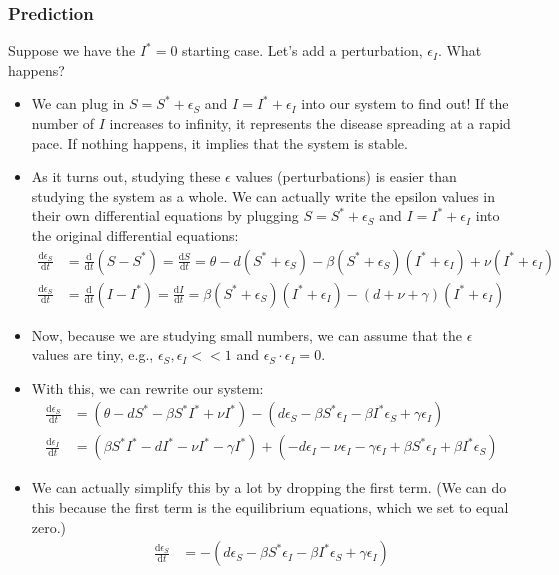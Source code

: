 \documentclass[10pt]{article}
\newcommand{\dd}{\text{d}}
\begin{document}
\subsubsection*{Prediction}
Suppose we have the $I^* = 0$ starting case.  Let's add a perturbation, $\epsilon_I$.  What happens?
\begin{itemize}
	\item We can plug in $S = S^* + \epsilon_S$ and $I = I^* + \epsilon_I$ into our system to find out!  If the number of $I$ increases to infinity, it represents the disease spreading at a rapid pace.  If nothing happens, it implies that the system is stable.
	\item As it turns out, studying these $\epsilon$ values (perturbations) is easier than studying the system as a whole.  We can actually write the epsilon values in their own differential equations by plugging $S = S^* + \epsilon_S$ and $I = I^* + \epsilon_I$ into the original differential equations:
	\begin{align*}
        \frac{\dd \epsilon_S}{\dd t} &= \frac{\dd}{\dd t} (S - S^*) = \frac{\dd S}{\dd t} = \theta - d(S^* + \epsilon_S) - \beta (S^* + \epsilon_S)(I^* + \epsilon_I) + \nu (I^* + \epsilon_I)\\
        \frac{\dd \epsilon_S}{\dd t} &= \frac{\dd}{\dd t} (I - I^*) = \frac{\dd I}{\dd t} = \beta (S^* + \epsilon_S)(I^* + \epsilon_I) - (d + \nu + \gamma) (I^* + \epsilon_I)
    \end{align*}
    \item Now, because we are studying small numbers, we can assume that the $\epsilon$ values are tiny, e.g., $\epsilon_S, \epsilon_I << 1$ and $\epsilon_S \cdot \epsilon_I = 0$.
    \item With this, we can rewrite our system:
    \begin{align*}
        \frac{\dd \epsilon_S}{\dd t} &= (\theta - dS^* - \beta S^* I^* + \nu I^*) - (d \epsilon_S - \beta S^* \epsilon_I - \beta I^* \epsilon_S + \gamma \epsilon_I)\\
        \frac{\dd \epsilon_I}{\dd t} &= (\beta S^* I^* - dI^* - \nu I^* - \gamma I^*) + (-d\epsilon_I - \nu \epsilon_I - \gamma \epsilon_I + \beta S^* \epsilon_I + \beta I^* \epsilon_S)
    \end{align*}
    \item We can actually simplify this by a lot by dropping the first term.  (We can do this because the first term is the equilibrium equations, which we set to equal zero.)
    \begin{align*}
        \frac{\dd \epsilon_S}{\dd t} &= - (d \epsilon_S - \beta S^* \epsilon_I - \beta I^* \epsilon_S + \gamma \epsilon_I)\\

\end{align*}
\end{itemize}
\end{document}
